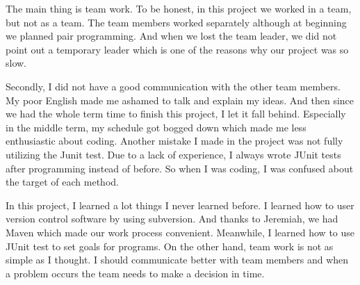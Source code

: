 The main thing is team work. To be honest, in this project we worked
in a team, but not as a team. The team members worked separately
although at beginning we planned pair programming. And when we lost
the team leader, we did not point out a temporary leader which is one
of the reasons why our project was so slow.

Secondly, I did not have a good communication with the other team
members. My poor English made me ashamed to talk and explain my
ideas. And then since we had the whole term time to finish this
project, I let it fall behind. Especially in the middle term, my
schedule got bogged down which made me less enthusiastic about
coding. Another mistake I made in the project was not fully utilizing
the Junit test. Due to a lack of experience, I always wrote JUnit
tests after programming instead of before. So when I was coding, I was
confused about the target of each method.

In this project, I learned a lot things I never learned before. I
learned how to user version control software by using subversion. And
thanks to Jeremiah, we had Maven which made our work process
convenient. Meanwhile, I learned how to use JUnit test to set goals
for programs. On the other hand, team work is not as simple as I
thought. I should communicate better with team members and when a
problem occurs the team needs to make a decision in time.



